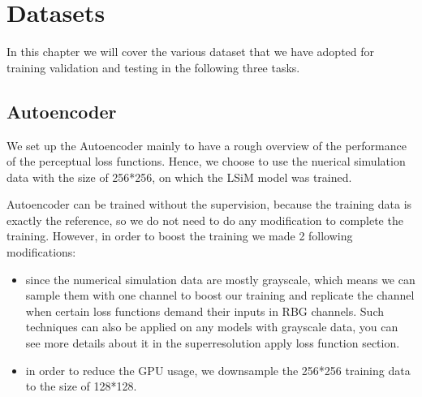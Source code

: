 \documentclass[a4paper,12pt,twoside]{report}
\begin{document}

\chapter{Datasets}
In this chapter we will cover the various dataset that we have adopted for training validation and testing in the following three tasks.

\section{Autoencoder}
We set up the Autoencoder mainly to have a rough overview of the performance of the perceptual loss functions. Hence, we choose to use the nuerical simulation data with the size of 256*256, on which the LSiM model was trained. 

Autoencoder can be trained without the supervision, because the training data is exactly the reference, so we do not need to do any modification to complete the training. However, in order to boost the training we made 2 following modifications:
\begin{itemize}
\item since the numerical simulation data are mostly grayscale, which means we can sample them with one channel to boost our training and replicate the channel when certain loss functions demand their inputs in RBG channels. Such techniques can also be applied on any models with grayscale data, you can see more details about it in the superresolution apply loss function section.
\item in order to reduce the GPU usage, we downsample the 256*256 training data to the size of 128*128.

\end{itemize}
\end{document}
